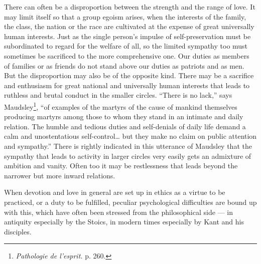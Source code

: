 \documentclass[12pt,a4paper,openany]{book}
\newcommand{\opage}[1]{\marginnote{\footnotesize\textit{[#1]}}}
\begin{document}
There can often be a disproportion between the strength and the range of love. It may limit itself so that a group
egoism arises, when the interests of the family, the class, the nation
\opage{238}or the race are cultivated at the expense of great universally human interests. Just as the single
person's impulse of self-preservation must be subordinated to regard for the welfare of all, so the limited sympathy
too must sometimes be sacrificed to the more comprehensive one. Our duties as members of families or as friends do
not stand above our duties as patriots and as men. But the disproportion may also be of the opposite kind. There may
be a sacrifice and enthusiasm for great national and universally human interests that leads to ruthless and brutal
conduct in the smaller circles. ``There is no lack,'' says Maudsley\footnote[1]{\textit{Pathologie de l'esprit.} p.
260.}, ``of examples of the martyrs of the cause of mankind themselves producing martyrs among those to whom they
stand in an intimate and daily relation. The humble and tedious duties and self-denials of daily life demand a calm
and unostentatious self-control\dots{} but they make no claim on public attention and sympathy.'' There is rightly
indicated in this utterance of Maudsley that the sympathy that leads to activity in larger circles very easily gets
an admixture of ambition and vanity. Often too it may be restlessness that leads beyond the narrower but more inward
relations.

When devotion and love in general are set up in ethics as a virtue to be practiced, or a duty to be fulfilled,
peculiar psychological difficulties are bound up with this, which have often been stressed from the philosophical
side --- in antiquity especially by the Stoics, in modern times especially by Kant and his disciples.
\end{document}
